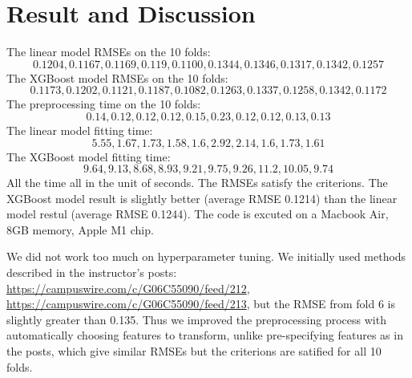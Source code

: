 \documentclass[12pt]{article}
\theoremstyle{plain}
\begin{document}
\section{Result and Discussion}
The linear model RMSEs on the 10 folds: 
\begin{equation}
0.1204, 0.1167, 0.1169, 0.119, 0.1100, 0.1344, 0.1346, 0.1317, 0.1342, 0.1257
\end{equation}
The XGBoost model RMSEs on the 10 folds: 
\begin{equation}
0.1173, 0.1202, 0.1121, 0.1187, 0.1082, 0.1263, 0.1337, 0.1258, 0.1342, 0.1172
\end{equation}
The preprocessing time on the 10 folds:
\begin{equation}
0.14, 0.12, 0.12, 0.12, 0.15, 0.23, 0.12, 0.12, 0.13, 0.13
\end{equation}
The linear model fitting time:
\begin{equation}
5.55, 1.67, 1.73, 1.58, 1.6, 2.92, 2.14, 1.6, 1.73, 1.61
\end{equation}
The XGBoost model fitting time:
\begin{equation}
9.64, 9.13, 8.68, 8.93, 9.21, 9.75, 9.26, 11.2, 10.05, 9.74
\end{equation}
All the time all in the unit of seconds. The RMSEs satisfy the criterions. The XGBoost model result is slightly better (average RMSE 0.1214) than the linear model restul (average RMSE 0.1244). The code is excuted on a Macbook Air, 8GB memory, Apple M1 chip.

We did not work too much on hyperparameter tuning. We initially used methods described in the instructor's posts: \url{https://campuswire.com/c/G06C55090/feed/212}, \url{https://campuswire.com/c/G06C55090/feed/213}, but the RMSE from fold 6 is slightly greater than 0.135. Thus we improved the preprocessing process with automatically choosing features to transform, unlike pre-specifying features as in the posts, which give similar RMSEs but the criterions are satified for all 10 folds.
\end{document}

